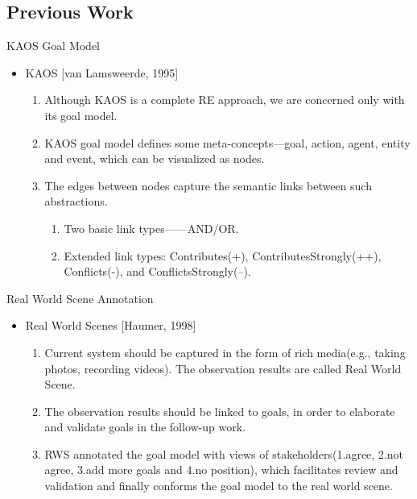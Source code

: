 \documentclass{beamer}
\begin{document}
\subsection{Previous Work}             %
\begin{frame}{KAOS Goal Model}
  \begin{itemize}
  \item
    KAOS [van Lamsweerde, 1995]
    \begin{enumerate}
    \item
      Although KAOS is a complete RE approach, we are concerned only with its goal model. 
    \item
      KAOS goal model defines some meta-concepts—goal, action, agent, entity and event, which can be visualized as nodes.
    \item 
      The edges between nodes capture the semantic links between such abstractions.
      \begin{enumerate}
      \item Two basic link types——AND/OR.
      \item Extended link types: Contributes(+), ContributesStrongly(++), Conflicts(-), and ConflictsStrongly(--).
      \end{enumerate}
    \end{enumerate}
  \end{itemize}
\end{frame}
\begin{frame}{Real World Scene Annotation}                     %
  \begin{itemize}
  \item
    Real World Scenes [Haumer, 1998]  %
    \begin{enumerate}
    \item
      Current system should be captured in the form of rich media(e.g., taking photos, recording videos). The observation results are called Real World Scene. 
    \item 
      The observation results should be linked to goals, in order to elaborate and validate goals in the follow-up work.
    \item
      RWS annotated the goal model with views of stakeholders(1.agree, 2.not agree, 3.add more goals and 4.no position), which facilitates review and validation and finally conforms the goal model to the real world scene. 
    \end{enumerate}
  \end{itemize}
\end{frame}
\end{document}
